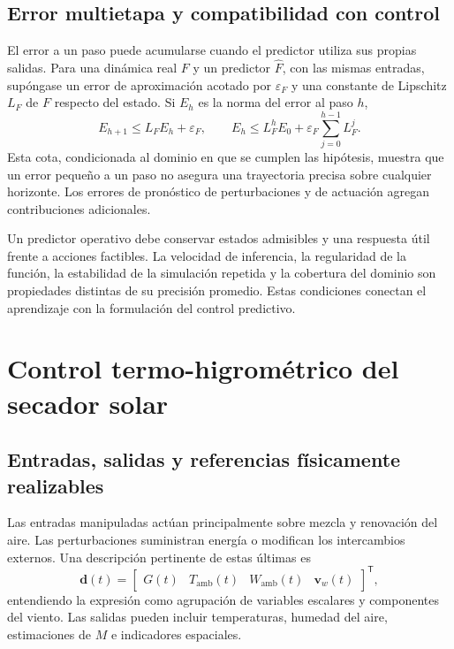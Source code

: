 \subsection{Error multietapa y compatibilidad con control}

El error a un paso puede acumularse cuando el predictor utiliza sus propias salidas. Para una dinámica real $F$ y un predictor $\widehat F$, con las mismas entradas, supóngase un error de aproximación acotado por $\varepsilon_F$ y una constante de Lipschitz $L_F$ de $F$ respecto del estado. Si $E_h$ es la norma del error al paso $h$,
\begin{equation}
E_{h+1}\leq L_FE_h+\varepsilon_F,
\qquad
E_h\leq L_F^hE_0
+\varepsilon_F\sum_{j=0}^{h-1}L_F^j.
\label{eq:propagacion_error_predictor}
\end{equation}
Esta cota, condicionada al dominio en que se cumplen las hipótesis, muestra que un error pequeño a un paso no asegura una trayectoria precisa sobre cualquier horizonte. Los errores de pronóstico de perturbaciones y de actuación agregan contribuciones adicionales.

Un predictor operativo debe conservar estados admisibles y una respuesta útil frente a acciones factibles. La velocidad de inferencia, la regularidad de la función, la estabilidad de la simulación repetida y la cobertura del dominio son propiedades distintas de su precisión promedio. Estas condiciones conectan el aprendizaje con la formulación del control predictivo.

\section{Control termo-higrométrico del secador solar}
\label{sec:control_termohigrometrico}

\subsection{Entradas, salidas y referencias físicamente realizables}

Las entradas manipuladas actúan principalmente sobre mezcla y renovación del aire. Las perturbaciones suministran energía o modifican los intercambios externos. Una descripción pertinente de estas últimas es
\begin{equation}
\mathbf d(t)=
\begin{bmatrix}
G(t)&T_{\mathrm{amb}}(t)&W_{\mathrm{amb}}(t)&\mathbf v_w(t)
\end{bmatrix}^{\mathsf T},
\label{eq:estado_entorno}
\end{equation}
entendiendo la expresión como agrupación de variables escalares y componentes del viento. Las salidas pueden incluir temperaturas, humedad del aire, estimaciones de $M$ e indicadores espaciales.

